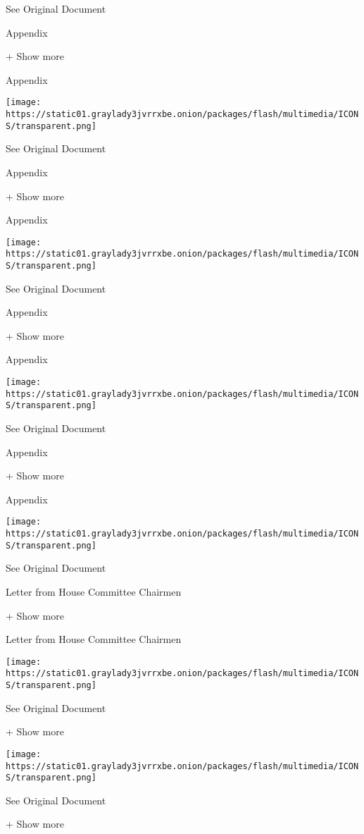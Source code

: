 See Original Document

Appendix

+ Show more

Appendix

\protect\hyperlink{}{}

\texttt{[image: https://static01.graylady3jvrrxbe.onion/packages/flash/multimedia/ICONS/transparent.png]}

See Original Document

Appendix

+ Show more

Appendix

\protect\hyperlink{}{}

\texttt{[image: https://static01.graylady3jvrrxbe.onion/packages/flash/multimedia/ICONS/transparent.png]}

See Original Document

Appendix

+ Show more

Appendix

\protect\hyperlink{}{}

\texttt{[image: https://static01.graylady3jvrrxbe.onion/packages/flash/multimedia/ICONS/transparent.png]}

See Original Document

Appendix

+ Show more

Appendix

\protect\hyperlink{}{}

\texttt{[image: https://static01.graylady3jvrrxbe.onion/packages/flash/multimedia/ICONS/transparent.png]}

See Original Document

Letter from House Committee Chairmen

+ Show more

Letter from House Committee Chairmen

\protect\hyperlink{}{}

\texttt{[image: https://static01.graylady3jvrrxbe.onion/packages/flash/multimedia/ICONS/transparent.png]}

See Original Document

+ Show more

\protect\hyperlink{}{}

\texttt{[image: https://static01.graylady3jvrrxbe.onion/packages/flash/multimedia/ICONS/transparent.png]}

See Original Document

+ Show more

